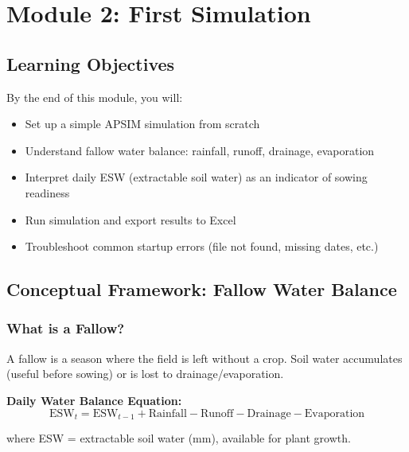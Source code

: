 
\chapter{Module 2: First Simulation}
\label{ch:module2}

\section{Learning Objectives}

By the end of this module, you will:
\begin{itemize}
  \item Set up a simple APSIM simulation from scratch
  \item Understand fallow water balance: rainfall, runoff, drainage, evaporation
  \item Interpret daily ESW (extractable soil water) as an indicator of sowing readiness
  \item Run simulation and export results to Excel
  \item Troubleshoot common startup errors (file not found, missing dates, etc.)
\end{itemize}

\section{Conceptual Framework: Fallow Water Balance}

\subsection{What is a Fallow?}

A fallow is a season where the field is left without a crop. Soil water accumulates (useful before sowing) or is lost to drainage/evaporation.

\begin{keyconceptbox}
\textbf{Daily Water Balance Equation:}
\[
\text{ESW}_{t} = \text{ESW}_{t-1} + \text{Rainfall} - \text{Runoff} - \text{Drainage} - \text{Evaporation}
\]

where ESW = extractable soil water (mm), available for plant growth.
\end{keyconceptbox}

